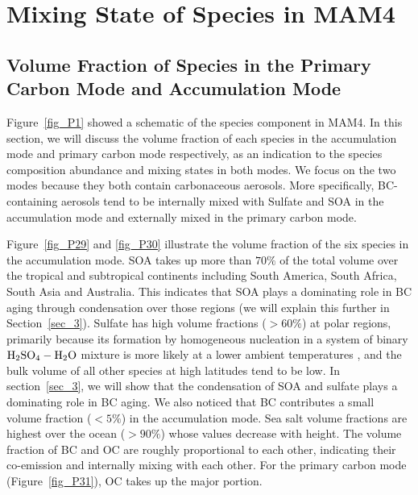 \documentclass[12pt, fullpage]{uiucthesis2009}
\begin{document}
	\clearpage
	
	\section{Mixing State of Species in MAM4}
	\subsection{Volume Fraction of Species in the Primary Carbon Mode and Accumulation Mode}
	Figure~\ref{fig_P1} showed a schematic of the species component in MAM4. In this section, we will discuss the volume fraction of each species in the accumulation mode and primary carbon mode respectively, as an indication to the species composition abundance and mixing states in both modes. We focus on the two modes because they both contain carbonaceous aerosols. More specifically, BC-containing aerosols tend to be internally mixed with Sulfate and SOA in the accumulation mode and externally mixed in the primary carbon mode.
	
	Figure~\ref{fig_P29} and \ref{fig_P30} illustrate the volume fraction of the six species in the accumulation mode. SOA takes up more than $70\%$ of the total volume over the tropical and subtropical continents including South America, South Africa, South Asia and Australia. This indicates that SOA plays a dominating role in BC aging through condensation over those regions (we will explain this further in Section~\ref{sec_3}). Sulfate has high volume fractions ($> 60\%$) at polar regions, primarily because its formation by homogeneous nucleation in a system of binary $\rm H_{2}SO_{4}-H_{2}O$ mixture is more likely at a lower ambient temperatures \citep[e.g.][]{hamill1977nchs,yue1982temperature}, and the bulk volume of all other species at high latitudes tend to be low. In section~\ref{sec_3}, we will show that the condensation of SOA and sulfate plays a dominating role in BC aging. We also noticed that BC contributes a small volume fraction ($< 5\%$) in the accumulation mode. Sea salt volume fractions are highest over the ocean ($> 90\%$) whose values decrease with height. The volume fraction of BC and OC are roughly proportional to each other, indicating their co-emission and internally mixing with each other. For the primary carbon mode (Figure~\ref{fig_P31}), OC takes up the major portion.
	
\end{document}
